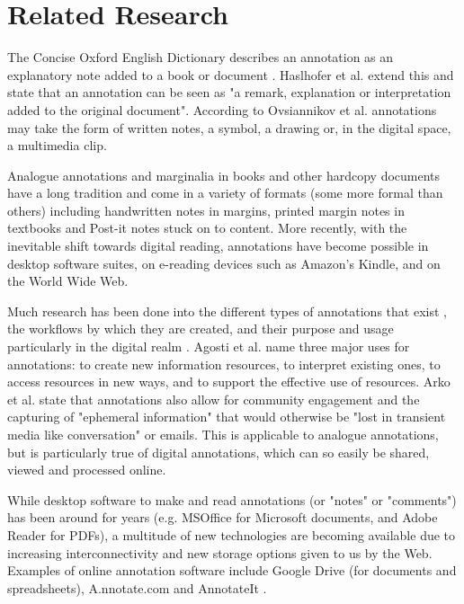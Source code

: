 
\chapter{Related Research} %

\label{Chapter3} %


The Concise Oxford English Dictionary describes an annotation as an explanatory note added to a book or document \citep{OxfordDict}. Haslhofer et al. \citep{LEMO} extend this and state that an annotation can be seen as "a remark, explanation or interpretation added to the original document". According to Ovsiannikov et al. \citep{Ovsiannikov} annotations may take the form of written notes, a symbol, a drawing or, in the digital space, a multimedia clip. 

Analogue annotations and marginalia in books and other hardcopy documents have a long tradition \citep{LEMO} and come in a variety of formats (some more formal than others) including handwritten notes in margins, printed margin notes in textbooks and Post-it notes stuck on to content. More recently, with the inevitable shift towards digital reading, annotations have become possible in desktop software suites, on e-reading devices such as Amazon's Kindle, and on the World Wide Web. 

Much research has been done into the different types of annotations that exist \citep{Marshall2000} \citep{Marshall2004}, the workflows by which they are created, and their purpose and usage  particularly in the digital realm \citep{Agosti} \citep{Ovsiannikov}. Agosti et al. \citep{Agosti} name three major uses for annotations: to create new information resources, to interpret existing ones, to access resources in new ways, and to support the effective use of resources.  Arko et al. \citep{Arko} state that annotations also allow for community engagement and the capturing of "ephemeral information" that would otherwise be "lost in transient media like conversation" or emails. This is applicable to analogue annotations, but is particularly true of digital annotations, which can so easily be shared, viewed and processed online.


While desktop software to make and read annotations (or "notes" or "comments") has been around for years (e.g. MSOffice \citep{MSOffice} for Microsoft documents, and Adobe Reader \citep{Adobe} for PDFs), a multitude of new technologies are becoming available due to increasing interconnectivity and new storage options given to us by the Web. Examples of online annotation software include Google Drive \citep{GDrive} (for documents and spreadsheets), A.nnotate.com \citep{AnnotateCom} and AnnotateIt \citep{AnnotateIt}.


